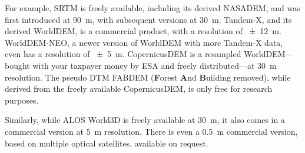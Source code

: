 %

For example, SRTM is freely available, 
including its derived NASADEM, and was first introduced at \qty{90}{m}, with subsequent versions at \qty{30}{m}.
Tandem-X, and its derived WorldDEM, is a commercial product, with a resolution of \qty{\pm12}{m}.
WorldDEM-NEO, a newer version of WorldDEM with more Tandem-X data, even has a resolution of \qty{\pm5}{m}.
CopernicusDEM is a resampled WorldDEM---bought with your taxpayer money by ESA and freely distributed---at \qty{30}{m} resolution.
The pseudo DTM FABDEM (\textbf{F}orest \textbf{A}nd \textbf{B}uilding removed), while derived from the freely available CopernicusDEM, is only free for research purposes.

Similarly, while ALOS World3D is freely available at \qty{30}{m}, it also comes in a commercial version at \qty{5}{m} resolution.
There is even a \qty{0.5}{m} commercial version, based on multiple optical satellites, available on request.




